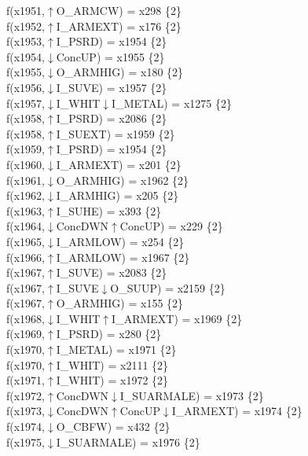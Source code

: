 f(x1951,$\uparrow$O\_ARMCW) = x298 \{2\} \\  
f(x1952,$\uparrow$I\_ARMEXT) = x176 \{2\} \\  
f(x1953,$\uparrow$I\_PSRD) = x1954 \{2\} \\  
f(x1954,$\downarrow$ConcUP) = x1955 \{2\} \\  
f(x1955,$\downarrow$O\_ARMHIG) = x180 \{2\} \\  
f(x1956,$\downarrow$I\_SUVE) = x1957 \{2\} \\  
f(x1957,$\downarrow$I\_WHIT$\downarrow$I\_METAL) = x1275 \{2\} \\  
f(x1958,$\uparrow$I\_PSRD) = x2086 \{2\} \\  
f(x1958,$\uparrow$I\_SUEXT) = x1959 \{2\} \\  
f(x1959,$\uparrow$I\_PSRD) = x1954 \{2\} \\  
f(x1960,$\downarrow$I\_ARMEXT) = x201 \{2\} \\  
f(x1961,$\downarrow$O\_ARMHIG) = x1962 \{2\} \\  
f(x1962,$\downarrow$I\_ARMHIG) = x205 \{2\} \\  
f(x1963,$\uparrow$I\_SUHE) = x393 \{2\} \\  
f(x1964,$\downarrow$ConcDWN$\uparrow$ConcUP) = x229 \{2\} \\  
f(x1965,$\downarrow$I\_ARMLOW) = x254 \{2\} \\  
f(x1966,$\uparrow$I\_ARMLOW) = x1967 \{2\} \\  
f(x1967,$\uparrow$I\_SUVE) = x2083 \{2\} \\  
f(x1967,$\uparrow$I\_SUVE$\downarrow$O\_SUUP) = x2159 \{2\} \\  
f(x1967,$\uparrow$O\_ARMHIG) = x155 \{2\} \\  
f(x1968,$\downarrow$I\_WHIT$\uparrow$I\_ARMEXT) = x1969 \{2\} \\  
f(x1969,$\uparrow$I\_PSRD) = x280 \{2\} \\  
f(x1970,$\uparrow$I\_METAL) = x1971 \{2\} \\  
f(x1970,$\uparrow$I\_WHIT) = x2111 \{2\} \\  
f(x1971,$\uparrow$I\_WHIT) = x1972 \{2\} \\  
f(x1972,$\uparrow$ConcDWN$\downarrow$I\_SUARMALE) = x1973 \{2\} \\  
f(x1973,$\downarrow$ConcDWN$\uparrow$ConcUP$\downarrow$I\_ARMEXT) = x1974 \{2\} \\  
f(x1974,$\downarrow$O\_CBFW) = x432 \{2\} \\  
f(x1975,$\downarrow$I\_SUARMALE) = x1976 \{2\} \\  
